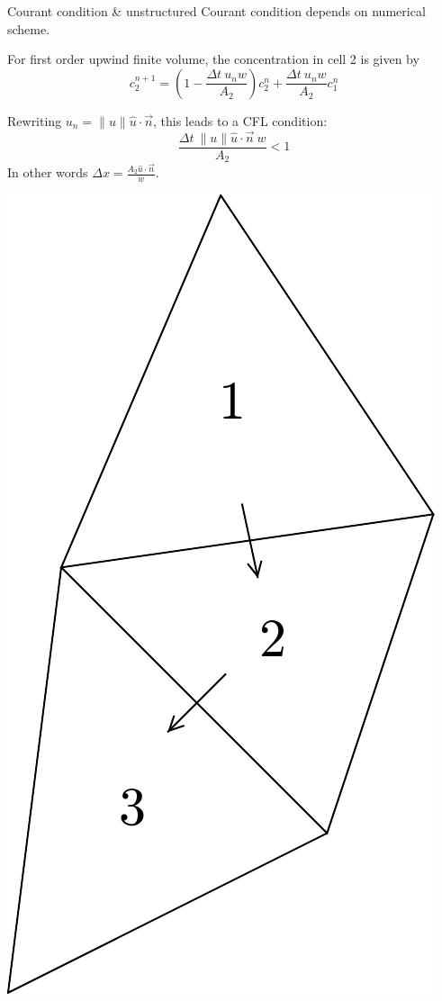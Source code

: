 \documentclass[12pt]{beamer}
\begin{document}
\begin{frame}{Courant condition \& unstructured}
  Courant condition depends on numerical scheme.
  \begin{example}
    \small
    \begin{minipage}{0.7\textwidth}
    For first order upwind finite volume, the concentration in cell 2 is given
    by
    \begin{equation*}
      c^{n+1}_2 = \left(1-\frac{\Delta t~u_n w}{A_2}\right) c^n_2
        +\frac{\Delta t~u_n w}{A_2} c^n_1
    \end{equation*}

    Rewriting $u_n=\|u\| \hat u\cdot\vec n$, this leads to a CFL condition:
    \begin{equation*}
        \frac{\Delta t~\|u\| \hat u\cdot\vec n~w}{A_2}<1
    \end{equation*}
    In other words $\Delta x=\frac{A_2 \hat u\cdot\vec n}w$.
    \end{minipage}%
    \begin{minipage}{0.3\textwidth}
    \includegraphics[width=\textwidth]{three_triangles}

\end{minipage}
\end{example}
\end{frame}
\end{document}
